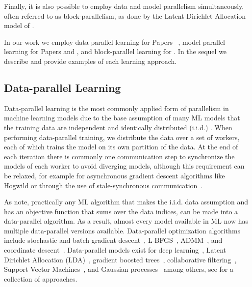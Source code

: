 Finally, it is also possible to employ data and model parallelism simultaneously,
often referred to as block-parallelism, as done by the Latent Dirichlet Allocation
model of \cite{petuum}.

In our work we employ data-parallel learning for Papers \conceptsicdmNum--\sessionlengthNum,
model-parallel learning for Papers \uncertaintreesNum and \boostvhtNum, and
block-parallel learning for \blockgbt. In the sequel we describe and provide
examples of each learning approach.

\subsection*{Data-parallel Learning}
\label{sec:bg-data-parallel}

Data-parallel learning is the most commonly applied form of parallelism
in machine learning models due to the base assumption of many ML models
that the training data are independent and identically distributed (i.i.d.)
\cite{distributed-ml-design}. When performing data-parallel training, we
distribute the data over a set of workers, each of which trains the model
on its own partition of the data. At the end of each iteration there is commonly one communication step
to synchronize the models of each worker to avoid diverging models, although
this requirement can be relaxed, for example for asynchronous gradient descent
algorithms like Hogwild \cite{hogwild} or through the use of stale-synchronous
communication~\cite{stale-sync-ps}.

As \citet{distributed-ml-design} note, practically any ML algorithm that makes
the i.i.d. data assumption and has an objective function that sums over
the data indices, can be made into a data-parallel algorithm. As a result,
almost every model available in ML now has multiple data-parallel versions
available. Data-parallel optimization algorithms include stochastic and batch gradient
descent~\cite{dekel-optimal-distributed, parallel-sgd}, L-BFGS~\cite{lbfgs-large-scale, vw},
ADMM~\cite{admm, admm-async}, and coordinate descent~\cite{rendle-distributed-cd, parallel-cd}.
Data-parallel models exist for deep learning~\cite{large-scale-dl}, Latent Dirichlet Allocation (LDA)~\cite{parallel-lda},
gradient boosted trees~\cite{xgboost, lightgbm}, collaborative filtering~\cite{koren-cf, parallel-cf}, Support Vector Machines~\cite{parallel-svm, psvm, parallel-svm-survey}, and Gaussian processes~\cite{gp-big-data, gp-distributed} among others,
see \cite{parallel-ml-book} for a collection of approaches.

